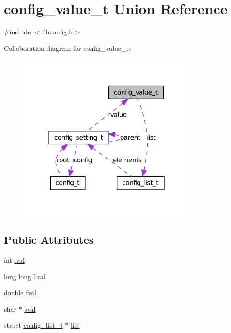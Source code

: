 \hypertarget{unionconfig__value__t}{
\section{config\_\-value\_\-t Union Reference}
\label{unionconfig__value__t}
}


{\ttfamily \#include $<$libconfig.h$>$}



Collaboration diagram for config\_\-value\_\-t:
\nopagebreak
\begin{figure}[H]
\begin{center}
\leavevmode
\includegraphics[width=258pt]{unionconfig__value__t__coll__graph}
\end{center}
\end{figure}
\subsection*{Public Attributes}
\begin{DoxyCompactItemize}
\item 
int \hyperlink{unionconfig__value__t_aa58090ef8528c7e35eb38c6ad23551e0}{ival}
\item 
long long \hyperlink{unionconfig__value__t_ac375626c7fff331cf0d1e866b033f20a}{llval}
\item 
double \hyperlink{unionconfig__value__t_a609c841d56ec29422ed61d12a90e7dfc}{fval}
\item 
char $\ast$ \hyperlink{unionconfig__value__t_a376d09b3da99952fcb1373b3574266ce}{sval}
\item 
struct \hyperlink{structconfig__list__t}{config\_\-list\_\-t} $\ast$ \hyperlink{unionconfig__value__t_a59f370b82f6ac0663825f8c90e12d63d}{list}
\end{DoxyCompactItemize}


